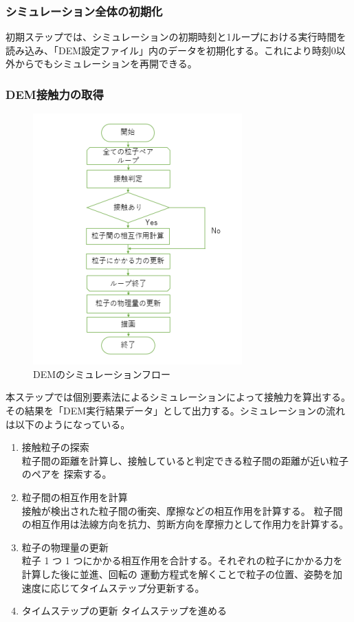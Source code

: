 \documentclass[12pt]{ltjsarticle}
\begin{document}
\subsubsection{シミュレーション全体の初期化}
初期ステップでは、シミュレーションの初期時刻と1ループにおける実行時間を読み込み、「DEM設定ファイル」内のデータを初期化する。これにより時刻0以外からでもシミュレーションを再開できる。

\subsubsection{DEM接触力の取得}
\begin{figure}[htbp]
  \begin{center}
  \includegraphics*{DEM_flow.PNG}
  \end{center}
\caption{DEMのシミュレーションフロー}
\end{figure}
本ステップでは個別要素法によるシミュレーションによって接触力を算出する。
その結果を「DEM実行結果データ」として出力する。シミュレーションの流れは以下のようになっている。
\begin{enumerate}
\item 接触粒子の探索 \\
粒子間の距離を計算し、接触していると判定できる粒子間の距離が近い粒子のペアを
探索する。
\item 粒子間の相互作用を計算 \\
接触が検出された粒子間の衝突、摩擦などの相互作用を計算する。 粒子間の相互作用は法線方向を抗力、剪断方向を摩擦力として作用力を計算する。
\item 粒子の物理量の更新 \\
粒子 1 つ 1 つにかかる相互作用を合計する。それぞれの粒子にかかる力を計算した後に並進、回転の 運動方程式を解くことで粒子の位置、姿勢を加速度に応じてタイムステップ分更新する。
\item タイムステップの更新
タイムステップを進める
\end{enumerate}
\end{document}

